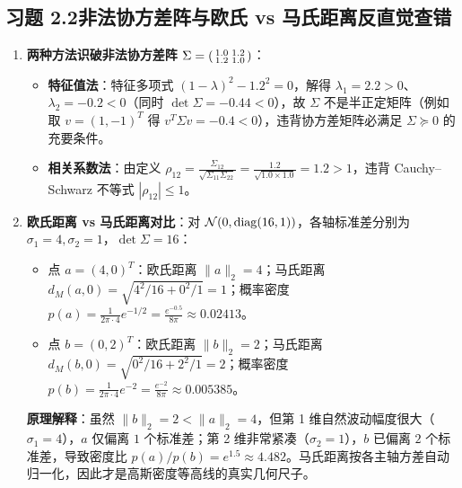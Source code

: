 \subsection*{习题 2.2\quad 非法协方差阵与欧氏 vs 马氏距离反直觉查错}
\begin{enumerate}[label=(\arabic*), leftmargin=1.8em]
  \item \textbf{两种方法识破非法协方差阵 $\Sigma = \begin{psmallmatrix} 1.0 & 1.2 \\ 1.2 & 1.0 \end{psmallmatrix}$}：
  \begin{itemize}
    \item \textbf{特征值法}：特征多项式 $(1-\lambda)^2 - 1.2^2 = 0$，解得 $\lambda_1 = 2.2 > 0$、$\lambda_2 = -0.2 < 0$（同时 $\det\Sigma = -0.44 < 0$），故 $\Sigma$ 不是半正定矩阵（例如取 $v = (1,-1)^T$ 得 $v^T\Sigma v = -0.4 < 0$），违背协方差矩阵必满足 $\Sigma \succeq 0$ 的充要条件。
    \item \textbf{相关系数法}：由定义 $\rho_{12} = \frac{\Sigma_{12}}{\sqrt{\Sigma_{11}\Sigma_{22}}} = \frac{1.2}{\sqrt{1.0\times 1.0}} = 1.2 > 1$，违背 Cauchy--Schwarz 不等式 $|\rho_{12}| \le 1$。
  \end{itemize}
  \item \textbf{欧氏距离 vs 马氏距离对比}：对 $\mathcal{N}(0, \operatorname{diag}(16, 1))$，各轴标准差分别为 $\sigma_1 = 4, \sigma_2 = 1$，$\det\Sigma = 16$：
  \begin{itemize}
    \item 点 $a = (4, 0)^T$：欧氏距离 $\|a\|_2 = 4$；马氏距离 $d_M(a, 0) = \sqrt{4^2/16 + 0^2/1} = 1$；概率密度 $p(a) = \frac{1}{2\pi\cdot 4}e^{-1/2} = \frac{e^{-0.5}}{8\pi} \approx 0.02413$。
    \item 点 $b = (0, 2)^T$：欧氏距离 $\|b\|_2 = 2$；马氏距离 $d_M(b, 0) = \sqrt{0^2/16 + 2^2/1} = 2$；概率密度 $p(b) = \frac{1}{2\pi\cdot 4}e^{-2} = \frac{e^{-2}}{8\pi} \approx 0.005385$。
  \end{itemize}
  \textbf{原理解释}：虽然 $\|b\|_2 = 2 < \|a\|_2 = 4$，但第 1 维自然波动幅度很大（$\sigma_1=4$），$a$ 仅偏离 $1$ 个标准差；第 2 维非常紧凑（$\sigma_2=1$），$b$ 已偏离 $2$ 个标准差，导致密度比 $p(a)/p(b) = e^{1.5} \approx 4.482$。马氏距离按各主轴方差自动归一化，因此才是高斯密度等高线的真实几何尺子。
\end{enumerate}

